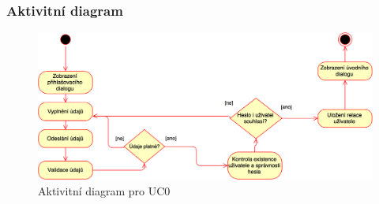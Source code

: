 \documentclass[a4paper,10pt,titlepage]{article}
\begin{document}
	\subsubsection*{Aktivitní diagram}
		\begin{figure}[h!]
			\centering
					\includegraphics[width=\textwidth]{vis_uc0_activity}
			\caption{Aktivitní diagram pro UC0}
		\end{figure}
	\vspace{5mm}
	
\end{document}
